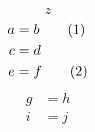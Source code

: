 \documentclass{article}
\newcommand{\numberthis}{\addtocounter{equation}{1}\tag{\theequation}}
\newcommand{\nn}{\nonumber}
\begin{document}
\begin{equation}z\label{z}\end{equation}
\begin{align*}
a &= b \numberthis \label{x}\\
c &= d \\
e &= f \numberthis \label{y}
\end{align*}
\begin{align}
g &= h \nn \\
i &= j \label{i}
\end{align}
\end{document}
